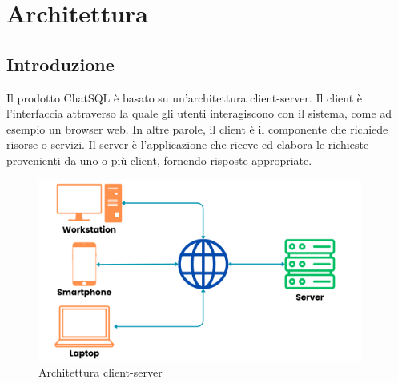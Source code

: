 \section{Architettura}

\subsection{Introduzione}
\par Il prodotto ChatSQL è basato su un'architettura client-server. Il client è l'interfaccia attraverso la quale gli utenti interagiscono con il sistema, come ad esempio un browser web. In altre parole, il client è il componente che richiede risorse o servizi. Il server è l'applicazione che riceve ed elabora le richieste provenienti da uno o più client, fornendo risposte appropriate.

\begin{figure}[H]
  \centering
  \includegraphics[width=0.95\textwidth]{assets/client_server.png}
  \caption{Architettura client-server}
\end{figure}

